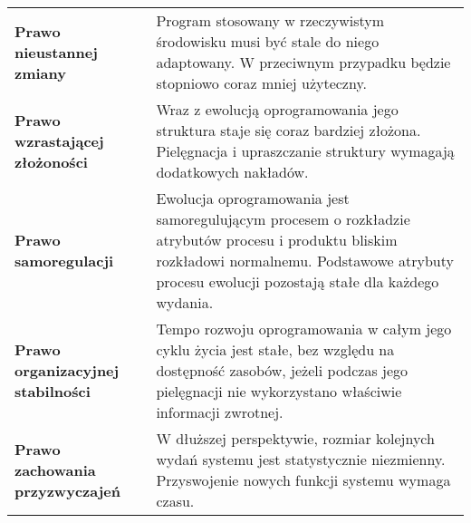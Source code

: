 \documentclass[../main.tex]{subfiles}
\begin{document}
    \begin{table}[H]
        \begin{center}
            \begin{tabular}{p{.4\linewidth} p{.6\linewidth}}
                \textbf{Prawo nieustannej zmiany}
                &
                Program stosowany w
                rzeczywistym środowisku musi być stale do niego
                adaptowany. W przeciwnym przypadku będzie
                stopniowo coraz mniej użyteczny.
                \\

                \cmidrule(r){1-1}\cmidrule(l){2-2}

                \textbf{Prawo wzrastającej złożoności}
                &
                Wraz z ewolucją
                oprogramowania jego struktura staje się coraz
                bardziej złożona. Pielęgnacja i upraszczanie struktury
                wymagają dodatkowych nakładów.
                \\

                \cmidrule(r){1-1}\cmidrule(l){2-2}


                \textbf{Prawo samoregulacji}
                &
                Ewolucja oprogramowania jest
                samoregulującym procesem o rozkładzie atrybutów
                procesu i produktu bliskim rozkładowi normalnemu.
                Podstawowe atrybuty procesu ewolucji pozostają stałe
                dla każdego wydania.
                \\

                \cmidrule(r){1-1}\cmidrule(l){2-2}


                \textbf{Prawo organizacyjnej stabilności}
                &
                Tempo rozwoju
                oprogramowania w całym jego cyklu życia jest stałe,
                bez względu na dostępność zasobów, jeżeli podczas
                jego pielęgnacji nie wykorzystano właściwie informacji
                zwrotnej.
                \\

                \cmidrule(r){1-1}\cmidrule(l){2-2}



                \textbf{Prawo zachowania przyzwyczajeń}
                &
                W dłuższej
                perspektywie, rozmiar kolejnych wydań systemu
                jest statystycznie niezmienny. Przyswojenie nowych
                funkcji systemu wymaga czasu.
                \\


\end{tabular}
\end{center}
\end{table}
\end{document}
